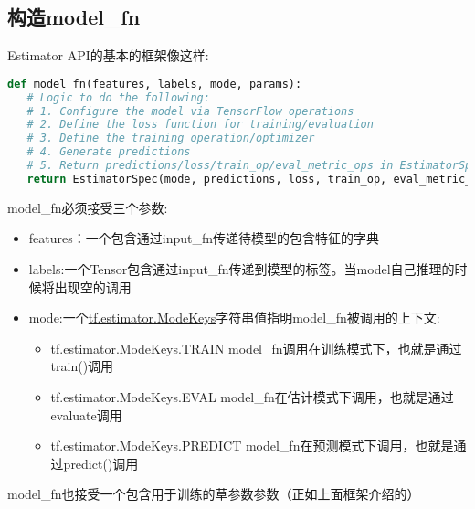 \subsection{构造model\_fn}
Estimator API的基本的框架像这样:
\begin{lstlisting}[language=Python]
def model_fn(features, labels, mode, params):
   # Logic to do the following:
   # 1. Configure the model via TensorFlow operations
   # 2. Define the loss function for training/evaluation
   # 3. Define the training operation/optimizer
   # 4. Generate predictions
   # 5. Return predictions/loss/train_op/eval_metric_ops in EstimatorSpec object
   return EstimatorSpec(mode, predictions, loss, train_op, eval_metric_ops)
\end{lstlisting}
model\_fn必须接受三个参数:
\begin{itemize}
	\item features：一个包含通过input\_fn传递待模型的包含特征的字典
	\item labels:一个Tensor包含通过input\_fn传递到模型的标签。当model自己推理的时候将出现空的调用
	\item mode:一个\href{https://www.tensorflow.org/api_docs/python/tf/estimator/ModeKeys}{tf.estimator.ModeKeys}字符串值指明model\_fn被调用的上下文:
		\begin{itemize}
	\item tf.estimator.ModeKeys.TRAIN model\_fn调用在训练模式下，也就是通过train()调用
	\item tf.estimator.ModeKeys.EVAL model\_fn在估计模式下调用，也就是通过evaluate调用
	\item tf.estimator.ModeKeys.PREDICT model\_fn在预测模式下调用，也就是通过predict()调用
		\end{itemize}
\end{itemize}
model\_fn也接受一个包含用于训练的草参数参数（正如上面框架介绍的）

